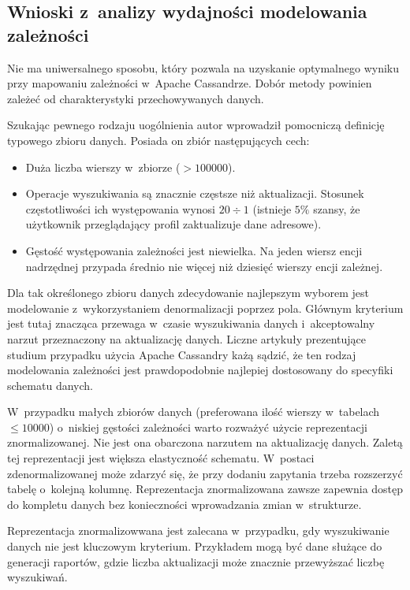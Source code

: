 \subsection{Wnioski z~analizy wydajności modelowania zależności}

Nie ma uniwersalnego sposobu, który pozwala na uzyskanie optymalnego wyniku przy mapowaniu zależności w~Apache Cassandrze. Dobór metody powinien zależeć od charakterystyki przechowywanych danych. 

Szukając pewnego rodzaju uogólnienia autor wprowadził pomocniczą definicję typowego zbioru danych. Posiada on zbiór następujących cech:

\begin{itemize}
	\item Duża liczba wierszy w~zbiorze ($> 100000$).
	\item Operacje wyszukiwania są znacznie częstsze niż aktualizacji. Stosunek częstotliwości ich występowania wynosi $20 \div 1$ (istnieje $5\%$ szansy, że użytkownik przeglądający profil zaktualizuje dane adresowe).
	\item Gęstość występowania zależności jest niewielka. Na jeden wiersz encji nadrzędnej przypada średnio nie więcej niż dziesięć wierszy encji zależnej. 
\end{itemize}

Dla tak określonego zbioru danych zdecydowanie najlepszym wyborem jest modelowanie z~wykorzystaniem denormalizacji poprzez pola. Głównym kryterium jest tutaj znacząca przewaga w~czasie wyszukiwania danych i~akceptowalny narzut przeznaczony na aktualizację danych. Liczne artykuły prezentujące studium przypadku użycia Apache Cassandry każą sądzić, że ten rodzaj modelowania zależności jest prawdopodobnie najlepiej dostosowany do specyfiki schematu danych. 

W~przypadku małych zbiorów danych (preferowana ilość wierszy w~tabelach $\leq 10000$) o~niskiej gęstości zależności warto rozważyć użycie reprezentacji znormalizowanej. Nie jest ona obarczona narzutem na aktualizację danych. Zaletą tej reprezentacji jest większa elastyczność schematu. W~postaci zdenormalizowanej może zdarzyć się, że przy dodaniu zapytania trzeba rozszerzyć tabelę o~kolejną kolumnę. Reprezentacja znormalizowana zawsze zapewnia dostęp do kompletu danych bez konieczności wprowadzania zmian w~strukturze. 

Reprezentacja znormalizowwana jest zalecana w~przypadku, gdy wyszukiwanie danych nie jest kluczowym kryterium. Przykładem mogą być dane służące do generacji raportów, gdzie liczba aktualizacji może znacznie przewyższać liczbę wyszukiwań. 


